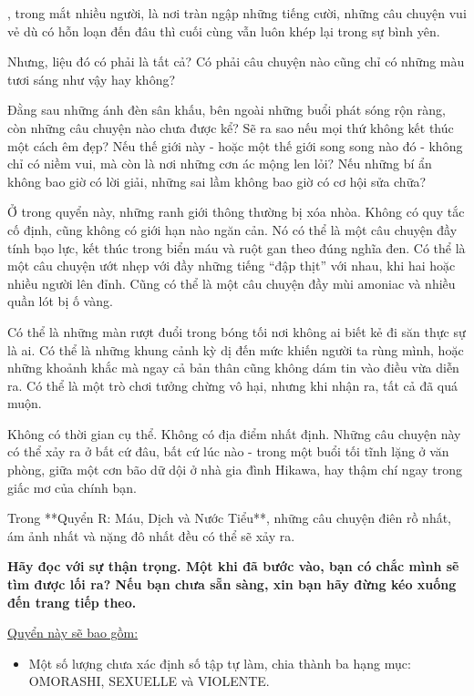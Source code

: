 \documentclass[main.tex]{subfiles}
\begin{document}
\hll, trong mắt nhiều người, là nơi tràn ngập những tiếng cười, những câu chuyện vui vẻ dù có hỗn loạn đến đâu thì cuối cùng vẫn luôn khép lại trong sự bình yên.

Nhưng, liệu đó có phải là tất cả? Có phải câu chuyện nào cũng chỉ có những màu tươi sáng như vậy hay không?

Đằng sau những ánh đèn sân khấu, bên ngoài những buổi phát sóng rộn ràng, còn những câu chuyện nào chưa được kể? Sẽ ra sao nếu mọi thứ không kết thúc một cách êm đẹp? Nếu thế giới này - hoặc một thế giới song song nào đó - không chỉ có niềm vui, mà còn là nơi những cơn ác mộng len lỏi? Nếu những bí ẩn không bao giờ có lời giải, những sai lầm không bao giờ có cơ hội sửa chữa?

Ở trong quyển này, những ranh giới thông thường bị xóa nhòa. Không có quy tắc cố định, cũng không có giới hạn nào ngăn cản. Nó có thể là một câu chuyện đầy tính bạo lực, kết thúc trong biển máu và ruột gan theo đúng nghĩa đen. Có thể là một câu chuyện ướt nhẹp với đầy những tiếng ``đập thịt'' với nhau, khi hai hoặc nhiều người lên đỉnh. Cũng có thể là một câu chuyện đầy mùi amoniac và nhiều quần lót bị ố vàng.

Có thể là những màn rượt đuổi trong bóng tối nơi không ai biết kẻ đi săn thực sự là ai. Có thể là những khung cảnh kỳ dị đến mức khiến người ta rùng mình, hoặc những khoảnh khắc mà ngay cả bản thân cũng không dám tin vào điều vừa diễn ra. Có thể là một trò chơi tưởng chừng vô hại, nhưng khi nhận ra, tất cả đã quá muộn.

Không có thời gian cụ thể. Không có địa điểm nhất định. Những câu chuyện này có thể xảy ra ở bất cứ đâu, bất cứ lúc nào - trong một buổi tối tĩnh lặng ở văn phòng, giữa một cơn bão dữ dội ở nhà gia đình Hikawa, hay thậm chí ngay trong giấc mơ của chính bạn.

Trong **Quyển R: Máu, Dịch và Nước Tiểu**, những câu chuyện điên rồ nhất, ám ảnh nhất và nặng đô nhất đều có thể sẽ xảy ra.

\textbf{Hãy đọc với sự thận trọng. Một khi đã bước vào, bạn có chắc mình sẽ tìm được lối ra? Nếu bạn chưa sẵn sàng, xin bạn hãy đừng kéo xuống đến trang tiếp theo.}

\underline{Quyển này sẽ bao gồm:}
\begin{itemize}
\item Một số lượng chưa xác định số tập tự làm, chia thành ba hạng mục: {\flaregothic \color{gold} OMORASHI}, {\flaregothic \color{violet} SEXUELLE} và {\flaregothic \color{red} VIOLENTE}.
\end{itemize}
\end{document}
